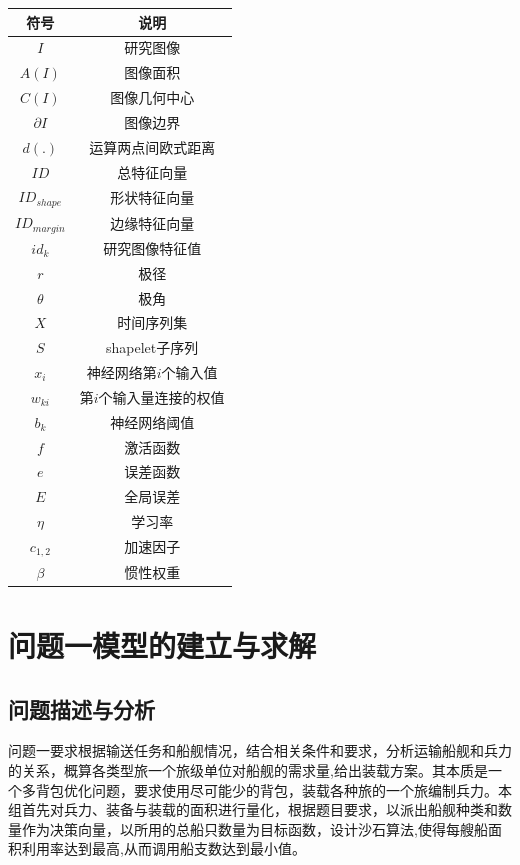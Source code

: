 \documentclass{whutmod}
\begin{document}
	\begin{table}[H]
	\label{biao} \centering
		\begin{tabular}{cc}
			\toprule[1.5pt]
			\multicolumn{1}{m{5cm}}{\centering 符号} & \multicolumn{1}{m{5cm}}{\centering 说明} \\
			\midrule[1pt]
			$I$  &  研究图像 \\ 
			$A(I)$  &  图像面积 \\ 
			$C(I)$  & 图像几何中心\\
			$\partial I$  &  图像边界 \\ 
		    $d(.)$ & 运算两点间欧式距离\\
			$ID$	 &  总特征向量  \\ 
			$ID_{shape}$ &  形状特征向量 \\ 
			$ID_{margin}$	 &  边缘特征向量 \\ 
			$id_{k}$  &   研究图像特征值\\ 
			$r$  &  极径\\	
			$\theta$ & 极角\\
			$X$ &  时间序列集\\ 
			$S$ & shapelet子序列\\
			$x_{i}$ & 神经网络第$i$个输入值\\
			$w_{ki}$ & 第$i$个输入量连接的权值\\
			$b_{k}$ & 神经网络阈值\\
			$f$  & 激活函数\\
			$e$ & 误差函数\\
			$E$ & 全局误差\\
			$\eta $ &  学习率\\
			$c_{1,2}$ & 加速因子\\
			$\beta$ & 惯性权重\\
			

		
			\bottomrule[1.5pt]
		\end{tabular}
	\end{table}

	\section{问题一模型的建立与求解}

    \subsection{问题描述与分析}

    问题一要求根据输送任务和船舰情况，结合相关条件和要求，分析运输船舰和兵力的关系，概算各类型旅一个旅级单位对船舰的需求量,给出装载方案。其本质是一个多背包优化问题，要求使用尽可能少的背包，装载各种旅的一个旅编制兵力。本组首先对兵力、装备与装载的面积进行量化，根据题目要求，以派出船舰种类和数量作为决策向量，以所用的总船只数量为目标函数，设计沙石算法,使得每艘船面积利用率达到最高,从而调用船支数达到最小值。
    
\end{document}
